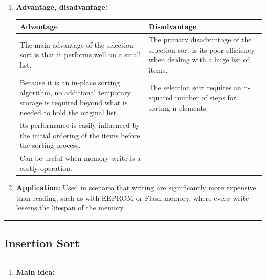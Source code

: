 \documentclass[11pt,a4paper]{article}
\begin{document}
{\begin{enumerate}[label=\textbf{\arabic*})]
					\textbf{Bingo sort}
					In the bingo sort variant, items are ordered by repeatedly looking through the remaining items to find the greatest value and moving all items with that value to their final location. This is an efficient variant if there are many duplicate values. Indeed, selection sort does one pass through the remaining items for each item moved. Bingo sort does one pass for each value (not item): after an initial pass to find the biggest value, the next passes can move every item with that value to its final location while finding the next value
				\item \textbf{Advantage, disadvantage:}
					\begin{table}[H]
						\centering
						\begin{tabular}{|p{8cm}|p{8cm}|}
							\hline
							\textbf{Advantage} & \textbf{Disadvantage} \\
							\hline
							\hline
							The main advantage of the selection sort is that it performs well on a small list. 							 											& The primary disadvantage of the selection sort is its poor efficiency when dealing with a huge list of items. \\[12pt]
							Because it is an in-place sorting algorithm, no additional temporary storage is required beyond what is needed to hold the original list. 				& The selection sort requires an n-squared number of steps for sorting n elements. \\[12pt]
							\vspace{12pt}
							Its performance is easily influenced by the initial ordering of the items before the sorting process. 													& \\[12pt]
							\vspace{12pt}
							Can be useful when memory write is a costly operation.  																								& \\
							\hline
						\end{tabular}
					\end{table}
				\item \textbf{Application:}	
					Used in scenario that writing are significantly more expensive than reading, such as with EEPROM or Flash memory, where every write lessens the lifespan of the memory
			\end{enumerate}
			
		\rule{15cm}{0.1cm}
		\subsection{Insertion Sort}
		\rule{15cm}{0.1cm}
			\begin{enumerate}[label=\textbf{\arabic*})]
				\item \textbf{Main idea:}
			

\end{enumerate}}
\end{document}

